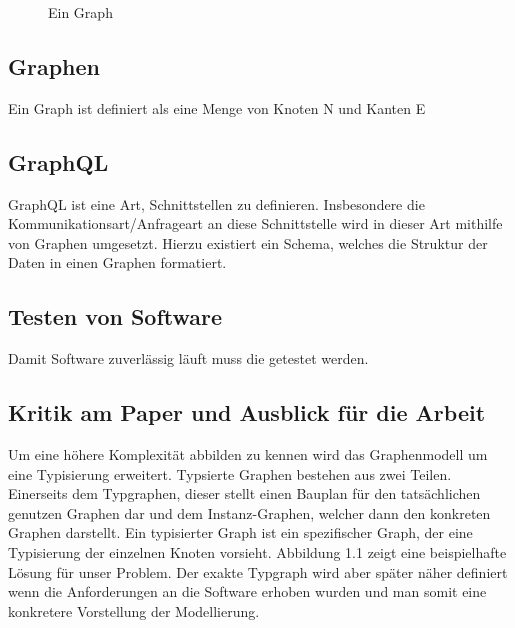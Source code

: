 \begin{figure}[!htbp]
    \begin{center}
        \caption{Ein Graph}
        \label{fig:simple-graph}
    \end{center}
\end{figure}


\subsection{Graphen}

Ein Graph ist definiert als eine Menge von Knoten N und Kanten E

\subsection{GraphQL}

GraphQL ist eine Art, Schnittstellen zu definieren. Insbesondere die Kommunikationsart/Anfrageart an diese Schnittstelle
wird in dieser Art mithilfe von Graphen umgesetzt. Hierzu existiert ein Schema, welches die Struktur der Daten in einen
Graphen formatiert.

\subsection{Testen von Software}

Damit Software zuverlässig läuft muss die getestet werden.

\subsection{Kritik am Paper und Ausblick für die Arbeit}



Um eine höhere Komplexität abbilden zu kennen wird das Graphenmodell um eine Typisierung erweitert.
Typsierte Graphen bestehen aus zwei Teilen. Einerseits dem Typgraphen, dieser stellt einen Bauplan für den tatsächlichen
genutzen Graphen dar und dem Instanz-Graphen, welcher dann den konkreten Graphen darstellt.
Ein typisierter Graph ist ein spezifischer Graph, der eine Typisierung der einzelnen Knoten vorsieht.
Abbildung 1.1 zeigt eine beispielhafte Lösung für unser Problem. Der exakte Typgraph wird aber später näher definiert wenn
die Anforderungen an die Software erhoben wurden und man somit eine konkretere Vorstellung der Modellierung.

